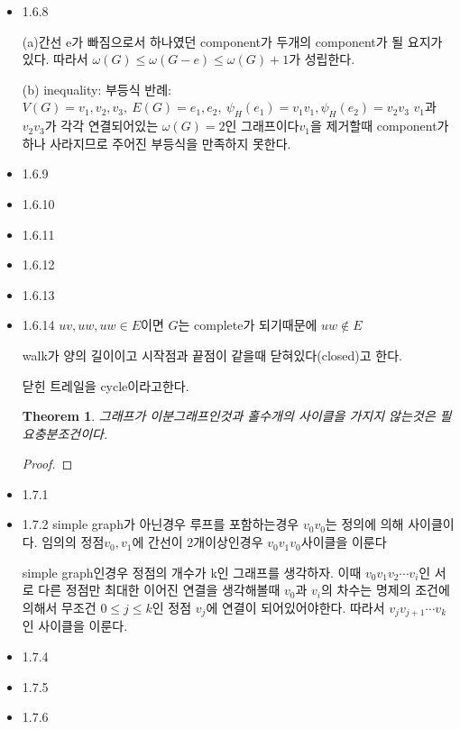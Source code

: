 \documentclass{oblivoir}
\newtheorem{theorem}{Theorem}[section]
\begin{document}
\begin{itemize}
    \item 1.6.8

    (a)간선 e가 빠짐으로서 하나였던 component가 두개의 component가 될 요지가 있다. 따라서 $\omega(G) \le \omega(G-e) \le \omega(G)+1 $가 성립한다.

    (b) inequality: 부등식
    반례: $V(G) = { v_1, v_2, v_3} ,\: E(G) = { e_1 , e_2} ,\: \psi_H(e_1) = v_1v_1 ,\psi_H(e_2) = v_2v_3  $
    $v_1$과 $v_2v_3$가 각각 연결되어있는 $\omega(G) = 2$인 그래프이다$v_1$을 제거할때 component가 하나 사라지므로 주어진 부등식을 만족하지 못한다.

    \item 1.6.9
    \item 1.6.10
    \item 1.6.11
    \item 1.6.12
    \item 1.6.13

    \item 1.6.14
    $uv, uw, uw \in E $이면 $G$는 complete가 되기때문에 $uw \notin E$

    \begin{dfn}[cycle]
    walk가 양의 길이이고 시작점과 끝점이 같을때 닫혀있다(closed)고 한다. 

    닫힌 트레일을 cycle이라고한다.
    \end{dfn}

    \begin{theorem}
        그래프가 이분그래프인것과 홀수개의 사이클을 가지지 않는것은 필요충분조건이다.
    \end{theorem}
    \begin{proof}
        
    \end{proof}

    \item 1.7.1
    \item 1.7.2
    simple graph가 아닌경우
          루프를 포함하는경우 $v_0v_0$는 정의에 의해 사이클이다.
               임의의 정점$v_0, v_1$에 간선이 2개이상인경우            $v_0v_1v_0$사이클을 이룬다
         
        simple graph인경우
            정점의 개수가 k인 그래프를 생각하자. 이때 $v_0v_1v_2 \cdots v_i$인 서로 다른 정점만 최대한 이어진 연결을 생각해볼때 $v_0$과 $v_i$의 차수는 명제의 조건에의해서 무조건 $0 \le j \le k$인 정점 $v_j$에 연결이 되어있어야한다. 따라서 $v_{j}v_{j+1} \cdots v_k$인 사이클을 이룬다.
    
    \item 1.7.4
    \item 1.7.5
    \item 1.7.6
    

\end{itemize}
\end{document}

